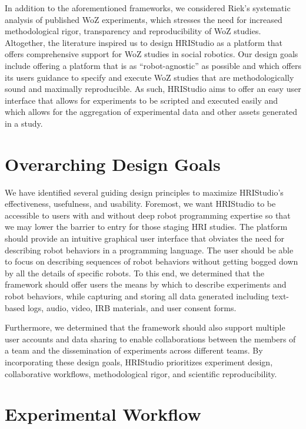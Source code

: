 \documentclass[letterpaper, 10 pt, conference]{ieeeconf}
\begin{document}
In addition to the aforementioned frameworks, we considered Riek's systematic analysis of published WoZ experiments, which stresses the need for increased methodological rigor, transparency and reproducibility of WoZ studies. \cite{Riek2012} Altogether, the literature inspired us to design HRIStudio as a platform that offers comprehensive support for WoZ studies in social robotics. Our design goals include offering a platform that is as ``robot-agnostic'' as possible and which offers its users guidance to specify and execute WoZ studies that are methodologically sound and maximally reproducible. As such, HRIStudio aims to offer an easy user interface that allows for experiments to be scripted and executed easily and which allows for the aggregation of experimental data and other assets generated in a study.

\section{Overarching Design Goals}

We have identified several guiding design principles to maximize HRIStudio's effectiveness, usefulness, and usability. Foremost, we want HRIStudio to be accessible to users with and without deep robot programming expertise so that we may lower the barrier to entry for those staging HRI studies. The platform should provide an intuitive graphical user interface that obviates the need for describing robot behaviors in a programming language. The user should be able to focus on describing sequences of robot behaviors without getting bogged down by all the details of specific robots. To this end, we determined that the framework should offer users the means by which to describe experiments and robot behaviors, while capturing and storing all data generated including text-based logs, audio, video, IRB materials, and user consent forms. 

Furthermore, we determined that the framework should also support multiple user accounts and data sharing to enable collaborations between the members of a team and the dissemination of experiments across different teams. By incorporating these design goals, HRIStudio prioritizes experiment design, collaborative workflows, methodological rigor, and scientific reproducibility.

\section{Experimental Workflow}
\end{document}
